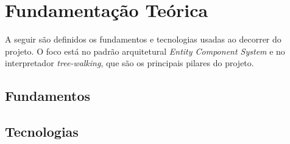 \chapter{Fundamentação Teórica}\label{ch:fundamentacao}

A seguir são definidos os fundamentos e tecnologias usadas ao decorrer do projeto. O foco está no padrão arquitetural \textit{Entity Component System} e no interpretador \textit{tree-walking}, que são os principais pilares do projeto.

\section{Fundamentos}













\section{Tecnologias}







